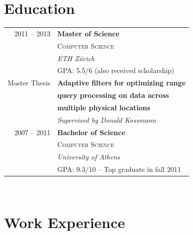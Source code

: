 \documentclass[10pt]{article} %
\begin{document}
\begin{minipage}[t]{0.5\textwidth} %
\vspace{0pt} %
	



\section{Education} 

\begin{tabular}{rl} %



2011 -- 2013 & \textbf{Master of Science} \\ 
& \textsc{Computer Science} \\ 
& \textit{ETH Z\"urich}\\
    \small  & GPA: 5.5/6 (also received scholarship) \\
Master Thesis
& \textbf{Adaptive filters for optimizing range}\\
& \textbf{query processing on data across}\\
& \textbf{multiple physical locations}\\
& \textit{Supervised by Donald Kossmann}\\
	 

2007 -- 2011 & \textbf{Bachelor of Science}\\
& \textsc{Computer Science} \\
& \textit{University of Athens} \\
\small  & GPA: 9.3/10 -- Top graduate in fall 2011\\
	
\end{tabular}\\[9pt]


\section{Work Experience} 


\end{minipage}
\end{document}
